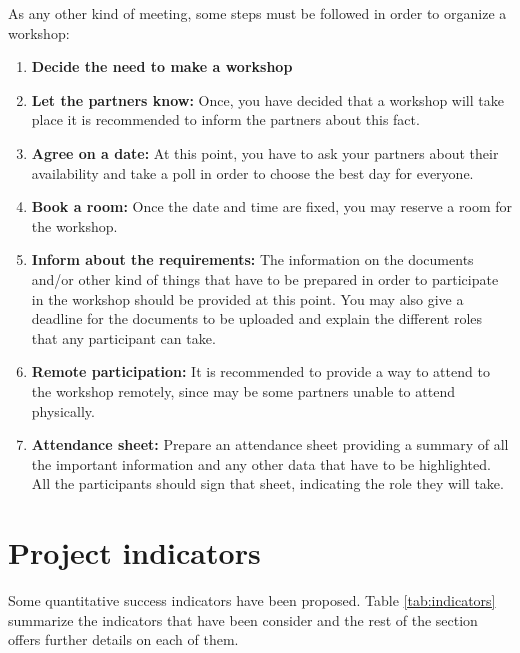 \documentclass[draftclsnofoot,12pt,journal,onecolumn]{IEEEtran}
\begin{document}
As any other kind of meeting, some steps must be followed in order to organize a workshop:

\begin{enumerate}
	\item \textbf{Decide the need to make a workshop}
	\item \textbf{Let the partners know:} Once, you have decided that a workshop will take place it is recommended to inform the partners 					about this fact.
	\item \textbf{Agree on a date:} At this point, you have to ask your partners about their availability and take a poll in order to 							choose the best day for everyone.
	\item \textbf{Book a room:} Once the date and time are fixed, you may reserve a room for the workshop.
	\item \textbf{Inform about the requirements:} The information on the documents and/or other kind of things that have to be prepared in 					order to participate in the workshop should be provided at this point. You may also give a deadline for the documents to be 							uploaded and explain the different roles that any participant can take.  
	\item \textbf{Remote participation:} It is recommended to provide a way to attend to the workshop remotely, since may be some partners 					unable to attend physically.  
	\item \textbf{Attendance sheet:} Prepare an attendance sheet providing a summary of all the important information and any other data 						that have to be highlighted. All the participants should sign that sheet, indicating the role they will take. 
\end{enumerate}
 

\section{Project indicators}
\label{sec:inidcators}

Some quantitative success indicators have been proposed.
Table \ref{tab:indicators} summarize the indicators that have been consider and the rest of the section offers further details on each of them.
\end{document}
